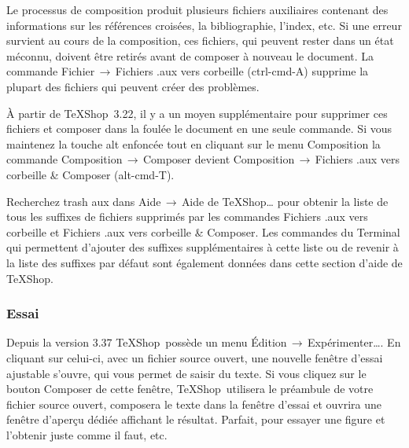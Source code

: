 \documentclass[11pt,french]{article}
\newcommand{\TS}{\textsf{\TeX Shop}}
\newcommand{\cmd}[1]{\textsf{#1}}
\newcommand{\mnu}[1]{\textsf{#1}}
\newcommand{\To}{\,\(\to\)\,}
\begin{document}
Le processus de composition produit plusieurs fichiers auxiliaires contenant des informations sur les références croisées, la bibliographie, l'index, etc. Si une erreur survient au cours de la composition, ces fichiers, qui peuvent rester dans un état méconnu, doivent être retirés avant de composer à nouveau le document. La commande \mnu{Fichier}\To\mnu{Fichiers .aux vers corbeille} (\cmd{ctrl-cmd-A}) supprime la plupart des fichiers qui peuvent créer des problèmes. 

À partir de \TS\ 3.22, il y a un moyen supplémentaire pour supprimer ces fichiers et composer dans la foulée le document en une seule commande. Si vous maintenez la touche \cmd{alt} enfoncée tout en cliquant sur le menu \mnu{Composition} la commande \mnu{Composition}\To\mnu{Composer} devient \mnu{Composition}\To\mnu{Fichiers .aux vers corbeille \& Composer} (\cmd{alt-cmd-T}). 

Recherchez \cmd{trash aux} dans \mnu{Aide}\To\mnu{Aide de TeXShop…} pour obtenir la liste de tous les suffixes de fichiers supprimés par les commandes \mnu{Fichiers .aux vers corbeille} et \mnu{Fichiers .aux vers corbeille \& Composer}. Les commandes du \cmd{Terminal} qui permettent d'ajouter des suffixes supplémentaires à cette liste ou de revenir à la liste des suffixes par défaut sont également données dans cette section d'aide de \TS.

\subsubsection{Essai}


Depuis la version 3.37 \TS\ possède un menu \mnu{Édition}\To\mnu {Expérimenter…}. En cliquant sur celui-ci, avec un fichier source ouvert, une nouvelle fenêtre d'essai ajustable s'ouvre, qui vous permet de saisir du texte. Si vous cliquez sur le bouton \mnu{Composer} de cette fenêtre, \TS\ utilisera le préambule de votre fichier source ouvert, composera le texte dans la fenêtre d'essai et ouvrira une fenêtre d'aperçu dédiée affichant le résultat. Parfait, pour essayer une figure et l'obtenir juste comme il faut, etc.
\end{document}
